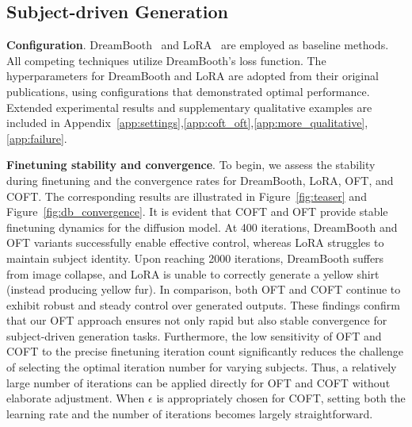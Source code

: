 \subsection{Subject-driven Generation}

\textbf{Configuration}. DreamBooth~\cite{ruiz2023dreambooth} and LoRA~\cite{hulora2022} are employed as baseline methods. All competing techniques utilize DreamBooth’s loss function. The hyperparameters for DreamBooth and LoRA are adopted from their original publications, using configurations that demonstrated optimal performance. Extended experimental results and supplementary qualitative examples are included in Appendix~\ref{app:settings},\ref{app:coft_oft},\ref{app:more_qualitative},\ref{app:failure}.

\textbf{Finetuning stability and convergence}. To begin, we assess the stability during finetuning and the convergence rates for DreamBooth, LoRA, OFT, and COFT. The corresponding results are illustrated in Figure~\ref{fig:teaser} and Figure~\ref{fig:db_convergence}. It is evident that COFT and OFT provide stable finetuning dynamics for the diffusion model. At 400 iterations, DreamBooth and OFT variants successfully enable effective control, whereas LoRA struggles to maintain subject identity. Upon reaching 2000 iterations, DreamBooth suffers from image collapse, and LoRA is unable to correctly generate a yellow shirt (instead producing yellow fur). In comparison, both OFT and COFT continue to exhibit robust and steady control over generated outputs. These findings confirm that our OFT approach ensures not only rapid but also stable convergence for subject-driven generation tasks. Furthermore, the low sensitivity of OFT and COFT to the precise finetuning iteration count significantly reduces the challenge of selecting the optimal iteration number for varying subjects. Thus, a relatively large number of iterations can be applied directly for OFT and COFT without elaborate adjustment. When $\epsilon$ is appropriately chosen for COFT, setting both the learning rate and the number of iterations becomes largely straightforward.

